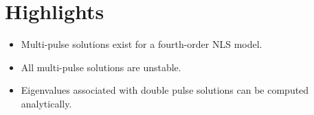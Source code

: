 \documentclass[12pt]{article}
\begin{document}
\section*{Highlights}

\begin{itemize}
    \item Multi-pulse solutions exist for a fourth-order NLS model.
    \item All multi-pulse solutions are unstable.
    \item Eigenvalues associated with double pulse solutions can be computed analytically.
\end{itemize}
\end{document}
